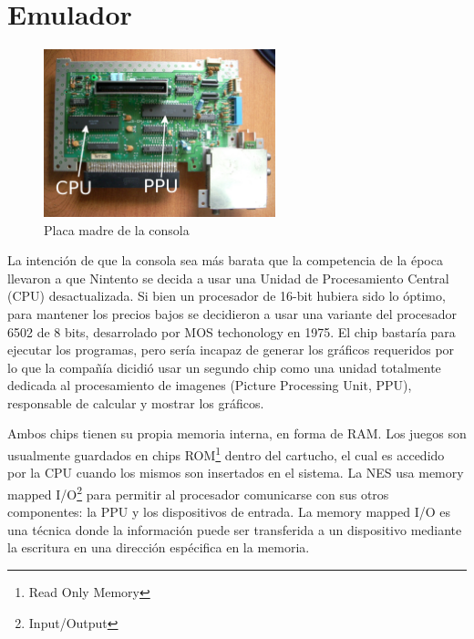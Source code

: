 \chapter{Emulador}
\begin{figure}\caption{Placa madre de la consola\label{fig:hardware}}
\includegraphics[width=0.6\textwidth]{hardware.jpg}
\end{figure}
La intención de que la consola sea más barata que la competencia de la época llevaron a que Nintento se decida a usar una Unidad de Procesamiento Central (CPU) desactualizada. Si bien un procesador de 16-bit hubiera sido lo óptimo, para mantener los precios bajos se decidieron a usar una variante del procesador 6502 de 8 bits, desarrolado por MOS techonology en 1975. El chip bastaría para ejecutar los programas, pero sería incapaz de generar los gráficos requeridos por lo que la compañía dicidió usar un segundo chip como una unidad totalmente dedicada al procesamiento de imagenes (Picture Processing Unit, PPU), responsable de calcular y mostrar los gráficos.



Ambos chips tienen su propia memoria interna, en forma de RAM. Los juegos son usualmente guardados en chips ROM\footnote{Read Only Memory} dentro del cartucho, el cual es accedido por la CPU cuando los mismos son insertados en el sistema.
La NES usa memory mapped I/O\footnote{Input/Output} para permitir al procesador comunicarse con sus otros componentes: la PPU y los dispositivos de entrada. La memory mapped I/O es una técnica donde la información puede ser transferida a un dispositivo mediante la escritura en una dirección espécifica en la memoria.


